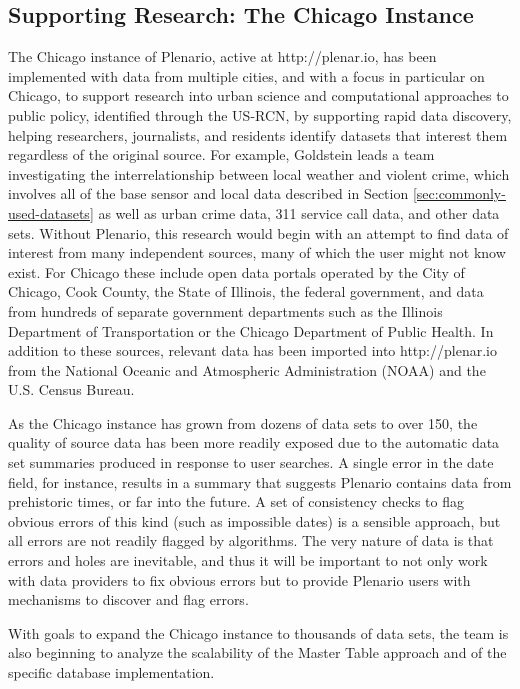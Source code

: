 \documentclass[11pt]{article}
\begin{document}
\subsection{\textbf{Supporting Research: The Chicago Instance}}\label{chicago-instance}
The Chicago instance of Plenario, active at http://plenar.io, has been implemented with data from multiple cities, and with a focus in particular on Chicago, to support research\textit{ }into urban science and computational approaches to public policy, identified through the US-RCN, by supporting rapid data discovery, helping researchers, journalists, and residents identify datasets that interest them regardless of the original source. For example, Goldstein leads a team investigating the interrelationship between local weather and violent crime, which involves all of the base sensor and local data described in Section \ref{sec:commonly-used-datasets} as well as urban crime data, 311 service call data, and other data sets. Without Plenario, this research would begin with an attempt to find data of interest from many independent sources, many of which the user might not know exist. For Chicago these include open data portals operated by the City of Chicago, Cook County, the State of Illinois, the federal government, and data from hundreds of separate government departments such as the Illinois Department of Transportation or the Chicago Department of Public Health. In addition to these sources, relevant data has been imported into http://plenar.io from the National Oceanic and Atmospheric Administration (NOAA) and the U.S. Census Bureau. 

As the Chicago instance has grown from dozens of data sets to over 150, the quality of source data has been more readily exposed due to the automatic data set summaries produced in response to user searches. A single error in the date field, for instance, results in a summary that suggests Plenario contains data from prehistoric times, or far into the future. A set of consistency checks to flag obvious errors of this kind (such as impossible dates) is a sensible approach, but all errors are not readily flagged by algorithms. The very nature of data is that errors and holes are inevitable, and thus it will be important to not only work with data providers to fix obvious errors but to provide Plenario users with mechanisms to discover and flag errors. 

With goals to expand the Chicago instance to thousands of data sets, the team is also beginning to analyze the scalability of the Master Table approach and of the specific database implementation.
\end{document}
